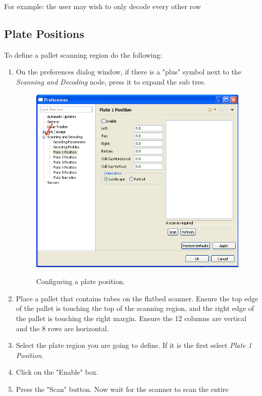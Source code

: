 \begin{description}
For example: the user may wish to only decode every other row

\subsection{Plate Positions}
To define a pallet scanning region do the following:
\begin{enumerate}
  \item On the preferences dialog window, if there is a "plus" symbol next to
    the \emph{Scanning and Decoding} node, press it to expand the sub
    tree.
    \begin{figure}[H]
      \centering
      \scalebox{0.5}
      { \includegraphics*{screenshots/configuration/plate1_definition} }
      \caption{Configuring a plate position.}
      \label{fig:plate1_definition}
    \end{figure}
  \item Place a pallet that contains tubes on the flatbed scanner. Ensure the
    top edge of the pallet is touching the top of the scanning region, and the right
    edge of the pallet is touching the right margin. Ensure the 12 columns
    are vertical and the 8 rows are horizontal.
  \item Select the plate region you are going to define.  If it is the first
    select \emph{Plate 1 Position}.
  \item Click on the "Enable" box.
  \item Press the "Scan" button. Now wait for the scanner to scan the entire

\end{enumerate}
\end{description}
